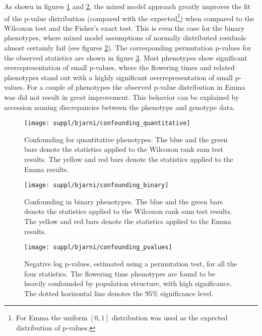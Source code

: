 \documentclass[10pt]{article}
\begin{document}
As shown in figures \ref{fig:confounding} and \ref{fig:confounding_binary}, the mixed model approach greatly improves the fit of the p-value distribution (compared with the expected\footnote{For Emma the uniform $[0,1]$ distribution was used as the expected distribution of p-values.}) when compared to the Wilcoxon test and the Fisher's exact test.  This is even the case for the binary phenotypes, where mixed model assumptions of normally distributed residuals almost certainly fail (see figures \ref{fig:confounding_binary}).  The corresponding permutation p-values for the observed statistics are shown in figure \ref{fig:confounding_pvals}.  Most phenotypes show significant overrepresentation of small p-values, where the flowering times and related phenotypes stand out with a highly significant overrepresentation of small p-values.  For a couple of phenotypes the observed p-value distribution in Emma was did not result in great improvement.  This behavior can be explained by accession naming discrepancies between the phenotype and genotype data.

\begin{figure}%
  \centering
  \texttt{[image: suppl/bjarni/confounding\_quantitative]}
  \caption{Confounding for quantitative phenotypes. The blue and the green bars denote the statistics applied to the Wilcoxon rank sum test results.  The yellow and red bars denote the statistics applied to the Emma results.}
  \label{fig:confounding}
\end{figure}

\begin{figure}%
  \centering
  \texttt{[image: suppl/bjarni/confounding\_binary]}
  \caption{Confounding in binary phenotypes. The blue and the green bars denote the statistics applied to the Wilcoxon rank sum test results.  The yellow and red bars denote the statistics applied to the Emma results.}\label{fig:confounding_binary}
\end{figure}

\begin{figure}%
  \centering
  \texttt{[image: suppl/bjarni/confounding\_pvalues]}
  \caption{Negative log p-values, estimated using a permutation test, for all the four statistics.  The flowering time phenotypes are found to be heavily confounded by population structure, with high significance.  The dotted horizontal line denotes the $95\%$ significance level.}
  \label{fig:confounding_pvals}
\end{figure}
\end{document}
